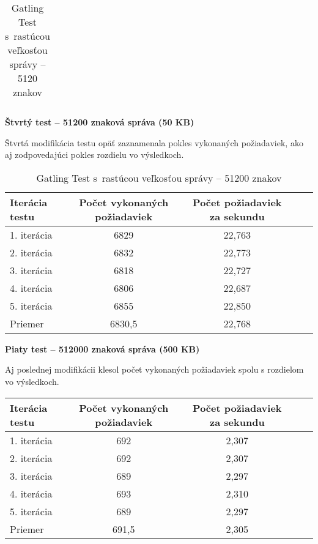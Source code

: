 \documentclass[12pt,oneside,final]{fithesis-utf8}
\begin{document}
\begin{itemize}
\begin{table}[H]
\begin{center}
\begin{tabular}{ | l | c | c | c | c |}
\end{tabular}
\end{center}
\caption{Gatling Test s~rastúcou veľkosťou správy -- 5120 znakov}
\end{table}


\textbf{Štvrtý test -- 51200 znaková správa (50 KB)}

Štvrtá modifikácia testu opäť zaznamenala pokles vykonaných požiadaviek, ako aj zodpovedajúci pokles rozdielu vo výsledkoch.

\begin{table}[H]
\begin{center}
\begin{tabular}{ | l | c | c | c | c |}
		\hline
		 \textbf{Iterácia testu} & \textbf{Počet vykonaných požiadaviek} & \textbf{Počet požiadaviek za sekundu} \\ \hline
		 1. iterácia & 6829 & 22,763 \\ \hline
		 2. iterácia & 6832 & 22,773 \\ \hline
		 3. iterácia & 6818 & 22,727 \\ \hline
		 4. iterácia & 6806 & 22,687 \\ \hline
		 5. iterácia & 6855 & 22,850 \\ \hline
		 Priemer & 6830,5 & 22,768 \\ \hline
		 
\end{tabular}
\end{center}
\caption{Gatling Test s~rastúcou veľkosťou správy -- 51200 znakov}
\end{table}


\textbf{Piaty test -- 512000 znaková správa (500 KB)}

Aj poslednej modifikácii klesol počet vykonaných požiadaviek spolu s rozdielom vo výsledkoch.

\begin{table}[H]
\begin{center}
\begin{tabular}{ | l | c | c | c | c |}
		\hline
		 \textbf{Iterácia testu} & \textbf{Počet vykonaných požiadaviek} & \textbf{Počet požiadaviek za sekundu} \\ \hline
		 1. iterácia & 692 & 2,307 \\ \hline
		 2. iterácia & 692 & 2,307 \\ \hline
		 3. iterácia & 689 & 2,297 \\ \hline
		 4. iterácia & 693 & 2,310 \\ \hline
		 5. iterácia & 689 & 2,297 \\ \hline
		 Priemer & 691,5 & 2,305 \\ \hline
		 

\end{tabular}
\end{center}
\end{table}
\end{itemize}
\end{document}

